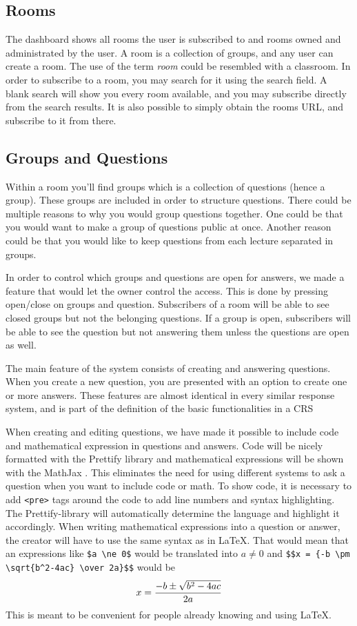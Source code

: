 \subsection{Rooms}
The dashboard shows all rooms the user is subscribed to and rooms owned and administrated by the user. A room is a collection of groups, and any user can create a room. The use of the term \emph{room} could be resembled with a classroom. In order to subscribe to a room, you may search for it using the search field. A blank search will show you every room available, and you may subscribe directly from the search results. It is also possible to simply obtain the rooms URL, and subscribe to it from there.

\subsection{Groups and Questions}
Within a room you'll find groups which is a collection of questions (hence a group). These groups are included in order to structure questions. There could be multiple reasons to why you would group questions together. One could be that you would want to make a group of questions public at once. Another reason could be that you would like to keep questions from each lecture separated in groups.

In order to control which groups and questions are open for answers, we made a feature that would let the owner control the access. This is done by pressing open/close on groups and question. Subscribers of a room will be able to see closed groups but not the belonging questions. If a group is open, subscribers will be able to see the question but not answering them unless the questions are open as well.

The main feature of the system consists of creating and answering questions. When you create a new question, you are presented with an option to create one or more answers.
These features are almost identical in every similar response system, and is part of the definition of the basic functionalities in a CRS 

When creating and editing questions, we have made it possible to include code and mathematical expression in questions and answers. Code will be nicely formatted with the Prettify library \cite{google/code-prettify_2016} and mathematical expressions will be shown with the MathJax \cite{mathjax_2016}. This eliminates the need for using different systems to ask a question when you want to include code or math. To show code, it is necessary to add \texttt{<pre>} tags around the code to add line numbers and syntax highlighting. The Prettify-library will automatically determine the language and highlight it accordingly. When writing mathematical expressions into a question or answer, the creator will have to use the same syntax as in \LaTeX. That would mean that an expressions like \verb|$a \ne 0$| would be translated into $a \ne 0$ and \verb|$$x = {-b \pm \sqrt{b^2-4ac} \over 2a}$$| would be $$x = {-b \pm \sqrt{b^2-4ac} \over 2a}$$
This is meant to be convenient for people already knowing and using \LaTeX.

